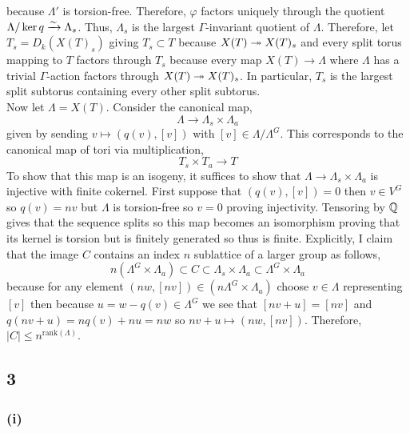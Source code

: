\documentclass[12pt]{article}
\begin{document}
because $\Lambda'$ is torsion-free. Therefore, $\varphi$ factors uniquely through the quotient $\Lambda / \ker{q} \xrightarrow{\sim} \Lambda_s$. Thus, $\Lambda_s$ is the largest $\Gamma$-invariant quotient of $\Lambda$. Therefore, let $T_s = D_k(X(T)_s)$ giving $T_s \subset T$ because $X(T) \twoheadrightarrow X(T)_s$ and every split torus mapping to $T$ factors through $T_s$ because every map $X(T) \to \Lambda$ where $\Lambda$ has a trivial $\Gamma$-action factors through $X(T) \twoheadrightarrow X(T)_s$. In particular, $T_s$ is the largest split subtorus containing every other split subtorus.  
\bigskip\\
Now let $\Lambda = X(T)$. Consider the canonical map,
\[ \Lambda \to \Lambda_s \times \Lambda_a \]
given by sending $v \mapsto (q(v), [v])$ with $[v] \in \Lambda / \Lambda^G$. This corresponds to the canonical map of tori via multiplication,
\[ T_s \times T_a \to T \]
To show that this map is an isogeny, it suffices to show that $\Lambda \to \Lambda_s \times \Lambda_a$ is injective with finite cokernel. First suppose that $(q(v), [v]) = 0$ then $v \in V^G$ so $q(v) = n v$ but $\Lambda$ is torsion-free so $v = 0$ proving injectivity. Tensoring by $\mathbb{Q}$ gives that the sequence splits so this map becomes an isomorphism proving that its kernel is torsion but is finitely generated so thus is finite. Explicitly, I claim that the image $C$ contains an index $n$ sublattice of a larger group as follows,
\[ n(\Lambda^G \times \Lambda_a) \subset C \subset \Lambda_s \times \Lambda_a \subset \Lambda^G \times \Lambda_a \]
because for any element $(n w, [nv]) \in (n \Lambda^G \times \Lambda_a)$ choose $v \in \Lambda$ representing $[v]$ then because $u = w - q(v) \in \Lambda^G$ we see that $[n v + u] = [n v]$ and $q(n v + u) = n q(v) + n u = nw$ so $n v + u \mapsto (nw, [nv])$. Therefore, $|C| \le n^{\mathrm{rank}(\Lambda)}$.

\subsection{3}

\subsubsection{(i)}

\renewcommand{\Aut}{\mathrm{Aut}}
\end{document}
